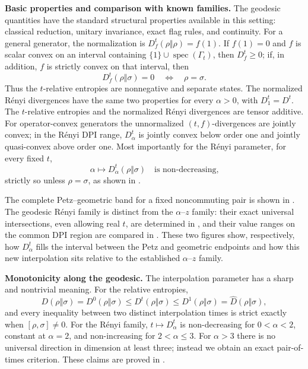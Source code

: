 \documentclass[11pt]{article}
\theoremstyle{remark}
\newcommand{\1}{\mathbbm{1}}
\begin{document}
\medskip
\noindent\textbf{Basic properties and comparison with known families.}
The geodesic quantities have the standard structural properties
available in this setting: classical reduction, unitary invariance,
exact flag rules, and continuity.  For a general generator, the
normalization is
$D_f^t(\rho\Vert\rho)=f(1)$.  If $f(1)=0$ and $f$ is scalar convex
on an interval containing $\{1\}\cup\operatorname{spec}(\Gamma_t)$,
then $D_f^t\geq0$; if, in addition, $f$ is strictly convex on that
interval, then
\begin{equation}
 D_f^t(\rho\Vert\sigma)=0
 \quad\Longleftrightarrow\quad \rho=\sigma.
 \label{rw:eq:intro-Dft-equality-separation}
\end{equation}
Thus the $t$-relative entropies are nonnegative and separate states.
The normalized R\'enyi divergences have the same two properties for
every $\alpha>0$, with $D_1^t=D^t$.  The $t$-relative entropies and
the normalized R\'enyi divergences are tensor additive.  For
operator-convex generators the
unnormalized $(t,f)$-divergences are jointly convex; in the R\'enyi
DPI range, $D_\alpha^t$ is jointly convex below order one and jointly
quasi-convex above order one.  Most importantly for the R\'enyi
parameter, for every fixed $t$,
\begin{equation}
 \alpha\longmapsto D_\alpha^t(\rho\Vert\sigma)
 \quad\text{is non-decreasing,}
 \label{rw:eq:intro-alpha-monotonicity}
\end{equation}
strictly so unless $\rho=\sigma$, as shown in
.

The complete Petz--geometric band for a fixed noncommuting pair is
shown in .  The geodesic
R\'enyi family is distinct from the $\alpha$--$z$ family: their exact
universal intersections, even allowing real $t$, are determined in
, and their value ranges on the
common DPI region are compared in
.  These two figures show,
respectively, how $D_\alpha^t$ fills the interval between the Petz and
geometric endpoints and how this new interpolation sits relative to
the established $\alpha$--$z$ family.

\medskip
\noindent\textbf{Monotonicity along the geodesic.}
The interpolation parameter has a sharp and nontrivial meaning.  For
the relative entropies,
\begin{equation}
 D(\rho\Vert\sigma)=D^0(\rho\Vert\sigma)
 \leq D^t(\rho\Vert\sigma)
 \leq D^1(\rho\Vert\sigma)=\widehat D(\rho\Vert\sigma),
 \label{rw:eq:intro-Dt-monotonicity}
\end{equation}
and every inequality between two distinct interpolation times is
strict exactly when $[\rho,\sigma]\neq0$.  For the R\'enyi family,
$t\mapsto D_\alpha^t$ is non-decreasing for $0<\alpha<2$, constant
at $\alpha=2$, and non-increasing for $2<\alpha\leq3$.  For
$\alpha>3$ there is no universal direction in dimension at least
three; instead we obtain an exact pair-of-times criterion.  These
claims are proved in
.
\end{document}
